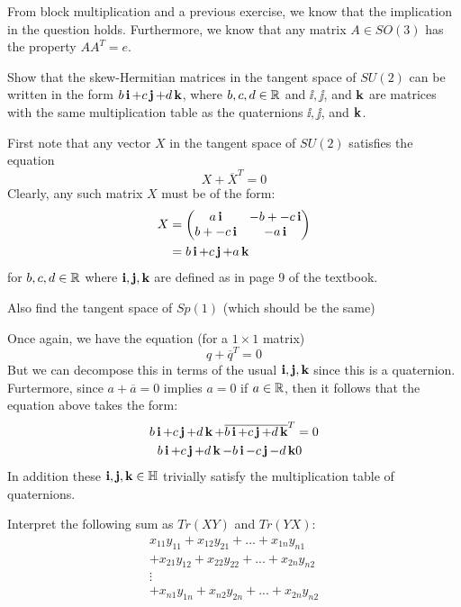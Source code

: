 \documentclass[12pt,onecolumn]{article}
\begin{document}
\begin{answer}
From block multiplication and a previous exercise, we know that the implication in the question holds. Furthermore, we know that any matrix $A \in SO(3)$ has the property $AA^T = e$. 
\end{answer}
\begin{exercise}
Show that the skew-Hermitian matrices in the tangent space of $SU(2)$ can be written in the form $b\operatorname{\textbf{i}}+c\operatorname{\textbf{j}}+d\operatorname{\textbf{k}}$, where $b,c,d \in \operatorname{\mathbb{R}}$ and $\ii, \jj$, and $\operatorname{\textbf{k}}$ are matrices with the same multiplication table as the quaternions $\ii, \jj$, and $\operatorname{\textbf{k}}$.
\end{exercise}
\begin{answer}
First note that any vector $X$ in the tangent space of $SU(2)$ satisfies the equation
$$ X + \overline{X}^T = 0$$
Clearly, any such matrix $X$ must be of the form:
\begin{align*}
    X &= \begin{pmatrix} a\operatorname{\textbf{i}} & -b + -c\operatorname{\textbf{i}} \\ b + -c\operatorname{\textbf{i}} & -a\operatorname{\textbf{i}} \end{pmatrix} \\
    &= b \operatorname{\textbf{i}} + c \operatorname{\textbf{j}}  + a \operatorname{\textbf{k}} 
\end{align*}
for $b,c,d \in \operatorname{\mathbb{R}}$ where $\operatorname{\textbf{i}},\operatorname{\textbf{j}},\operatorname{\textbf{k}}$ are defined as in page 9 of the textbook.
\end{answer}
\begin{exercise}
Also find the tangent space of $Sp(1)$ (which should be the same)
\end{exercise}
\begin{answer}
Once again, we have the equation (for a $1\times 1$ matrix)
$$ q + \overline{q}^T = 0$$
But we can decompose this in terms of the usual $\operatorname{\textbf{i}},\operatorname{\textbf{j}},\operatorname{\textbf{k}}$ since this is a quaternion. Furtermore, since $a + \overline{a} = 0 $ implies $a =0$ if $a \in \operatorname{\mathbb{R}}$, then it follows that the equation above takes the form:
\begin{align*}
    b\operatorname{\textbf{i}} + c\operatorname{\textbf{j}} + d\operatorname{\textbf{k}} + \overline{b\operatorname{\textbf{i}} + c\operatorname{\textbf{j}} + d\operatorname{\textbf{k}}}^T &= 0 \\
    b \operatorname{\textbf{i}} + c\operatorname{\textbf{j}} + d \operatorname{\textbf{k}} -b\operatorname{\textbf{i}} -c\operatorname{\textbf{j}} -d\operatorname{\textbf{k}} &0
\end{align*}
In addition these $\operatorname{\textbf{i}},\operatorname{\textbf{j}},\operatorname{\textbf{k}} \in \mathbb{H}$ trivially satisfy the multiplication table of quaternions.
\end{answer}
\begin{exercise}
Interpret the following sum as $Tr(XY)$ and $Tr(YX)$:
\begin{align*}
      x_{11}y_{11} +  x_{12}y_{21} + ... +  x_{1n}y_{n1}\\
    + x_{21}y_{12} +  x_{22}y_{22} + ... +  x_{2n}y_{n2}\\
    \vdots \quad \\
    + x_{n1}y_{1n} +  x_{n2}y_{2n} + ... +  x_{2n}y_{n2}
\end{align*}
\end{exercise}
\end{document}
